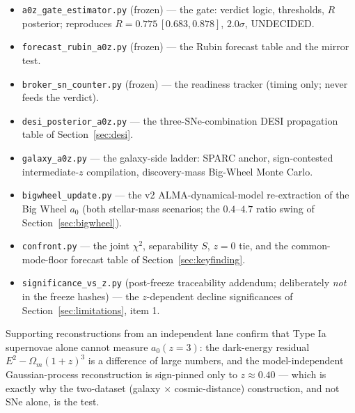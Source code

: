 \documentclass[11pt,a4paper]{article}
\newcommand{\azero}{a_0}
\begin{document}
\begin{itemize}
\item \texttt{a0z\_gate\_estimator.py} (frozen) --- the gate: verdict logic,
thresholds, $R$ posterior; reproduces $R=0.775\,[0.683,0.878]$, $2.0\sigma$,
UNDECIDED.
\item \texttt{forecast\_rubin\_a0z.py} (frozen) --- the Rubin forecast table
and the mirror test.
\item \texttt{broker\_sn\_counter.py} (frozen) --- the readiness tracker
(timing only; never feeds the verdict).
\item \texttt{desi\_posterior\_a0z.py} --- the three-SNe-combination DESI
propagation table of Section~\ref{sec:desi}.
\item \texttt{galaxy\_a0z.py} --- the galaxy-side ladder: SPARC anchor,
sign-contested intermediate-$z$ compilation, discovery-mass Big-Wheel Monte
Carlo.
\item \texttt{bigwheel\_update.py} --- the v2 ALMA-dynamical-model
re-extraction of the Big Wheel $\azero$ (both stellar-mass scenarios; the
$0.4$--$4.7$ ratio swing of Section~\ref{sec:bigwheel}).
\item \texttt{confront.py} --- the joint $\chi^2$, separability $S$, $z=0$
tie, and the common-mode-floor forecast table of
Section~\ref{sec:keyfinding}.
\item \texttt{significance\_vs\_z.py} (post-freeze traceability addendum;
deliberately \emph{not} in the freeze hashes) --- the $z$-dependent decline
significances of Section~\ref{sec:limitations}, item 1.
\end{itemize}

Supporting reconstructions from an independent lane confirm that Type Ia
supernovae alone cannot measure $\azero(z{=}3)$: the dark-energy residual
$E^2-\Omega_m(1+z)^3$ is a difference of large numbers, and the
model-independent Gaussian-process reconstruction \cite{Seikel2012} is
sign-pinned only to $z\approx0.40$ --- which is exactly why the two-dataset
(galaxy $\times$ cosmic-distance) construction, and not SNe alone, is the
test.
\end{document}
